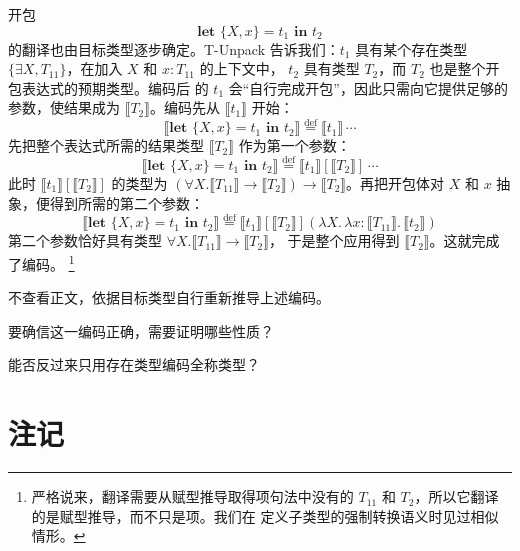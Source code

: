 开包
\[
\textbf{let }\{X,x\}=t_1\textbf{ in }t_2
\]
的翻译也由目标类型逐步确定。T-Unpack 告诉我们：\(t_1\) 具有某个存在类型
\(\{\exists X,T_{11}\}\)，在加入 \(X\) 和 \(x:T_{11}\) 的上下文中，
\(t_2\) 具有类型 \(T_2\)，而 \(T_2\) 也是整个开包表达式的预期类型。编码后
的 \(t_1\) 会“自行完成开包”，因此只需向它提供足够的参数，使结果成为
\(\llbracket T_2\rrbracket\)。编码先从 \(\llbracket t_1\rrbracket\) 开始：
\[
\llbracket\textbf{let }\{X,x\}=t_1\textbf{ in }t_2\rrbracket
\stackrel{\mathrm{def}}{=}\llbracket t_1\rrbracket\,\cdots
\]
先把整个表达式所需的结果类型 \(\llbracket T_2\rrbracket\) 作为第一个参数：
\[
\llbracket\textbf{let }\{X,x\}=t_1\textbf{ in }t_2\rrbracket
\stackrel{\mathrm{def}}{=}
\llbracket t_1\rrbracket[\llbracket T_2\rrbracket]\,\cdots
\]
此时 \(\llbracket t_1\rrbracket[\llbracket T_2\rrbracket]\) 的类型为
\((\forall X.\llbracket T_{11}\rrbracket\to
\llbracket T_2\rrbracket)\to\llbracket T_2\rrbracket\)。再把开包体对
\(X\) 和 \(x\) 抽象，便得到所需的第二个参数：
\[
\llbracket\textbf{let }\{X,x\}=t_1\textbf{ in }t_2\rrbracket
\stackrel{\mathrm{def}}{=}
\llbracket t_1\rrbracket[\llbracket T_2\rrbracket]
(\lambda X.\,\lambda x:\llbracket T_{11}\rrbracket.\,
 \llbracket t_2\rrbracket)
\]
第二个参数恰好具有类型
\(\forall X.\llbracket T_{11}\rrbracket\to\llbracket T_2\rrbracket\)，
于是整个应用得到 \(\llbracket T_2\rrbracket\)。这就完成了编码。
\footnote{严格说来，翻译需要从赋型推导取得项句法中没有的
\(T_{11}\) 和 \(T_2\)，所以它翻译的是赋型推导，而不只是项。我们在
定义子类型的强制转换语义时见过相似情形。}

\begin{exercise}
\label{ex:24.3.1}
不查看正文，依据目标类型自行重新推导上述编码。
\end{exercise}

\begin{exercise}[\(\star\star\star\)]
\label{ex:24.3.2}
要确信这一编码正确，需要证明哪些性质？
\end{exercise}

\begin{exercise}[\(\star\star\star\star\)]
\label{ex:24.3.3}
能否反过来只用存在类型编码全称类型？
\end{exercise}

\section{注记}
\label{sec:24.4}

